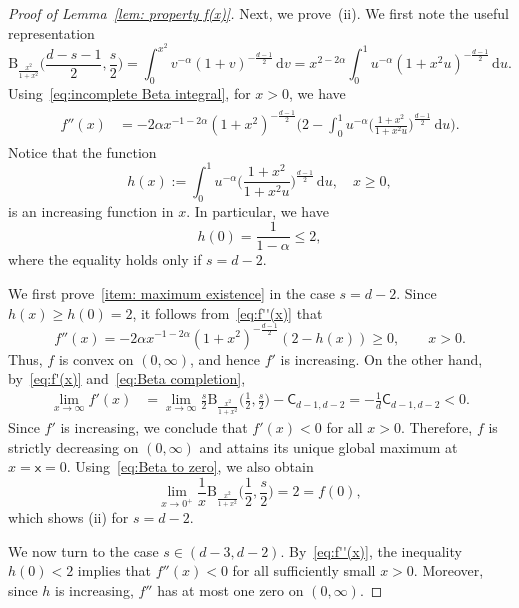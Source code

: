 \documentclass[10pt,a4paper]{amsart}
\newcommand{\ud}{\, \mathrm{d}}
\begin{document}
\begin{proof}[Proof of Lemma~\ref{lem: property f(x)}]
\medskip
Next, we prove~\textrm{(ii)}. We first note the useful representation 
\begin{equation}\label{eq:incomplete Beta integral}
    \mathrm{B}_{\frac{x^2}{1+x^2}}\Big(\frac{d-s-1}{2},\frac{s}{2}\Big) = \int_0^{x^2} v^{-\alpha}(1+v)^{-\frac{d-1}{2}}\ud v= x^{2-2\alpha}\int_0^1 u^{-\alpha}(1+x^2u)^{-\frac{d-1}{2}}\ud u.
\end{equation}
Using~\eqref{eq:incomplete Beta integral}, for $x>0$, we have 
\begin{align}\label{eq:f''(x)}
\begin{split}
    f''(x) 
    &= -2\alpha x^{-1-2\alpha}(1+x^2)^{-\frac{d-1}{2}}\bigg(2- \int_0^1  u^{-\alpha}\Big(\frac{1+x^2}{1+x^2u}\Big)^{\frac{d-1}{2}}\ud u\bigg).
\end{split}
\end{align}
Notice that the function
\[
h(x):= \int_0^1  u^{-\alpha}\Big(\frac{1+x^2}{1+x^2u}\Big)^{\frac{d-1}{2}}\ud u, \quad x\ge 0,
\]
is an increasing function in $x$. In particular, we have
\begin{equation}
    h(0) = \frac{1}{1-\alpha}\le 2,
\end{equation}
where the equality holds only if $s=d-2$. 

We first prove~\ref{item: maximum existence} in the case $s=d-2$. Since
$h(x)\ge h(0)=2$, it follows from~\eqref{eq:f''(x)} that 
\[
    f''(x) = -2\alpha x^{-1-2\alpha}(1+x^2)^{-\frac{d-1}{2}} (2-h(x) )\ge  0, \qquad x>0. 
\]
Thus, $f$ is convex on $(0,\infty)$, and hence $f'$ is increasing. On the
other hand, by~\eqref{eq:f'(x)} and~\eqref{eq:Beta completion}, 
\begin{align*}
    \lim_{x\to\infty} f'(x) &= \lim_{x\to\infty}\frac{s}{2}\mathrm{B}_{\frac{x^2}{1+x^2}}\Big(\frac{1}{2},\frac{s}{2}\Big) -\mathsf{C}_{d-1,d-2}=-\frac{1}{d}\mathsf{C}_{d-1,d-2}<0.
\end{align*}
Since $f'$ is increasing, we conclude that $f'(x)<0$ for all $x>0$.
Therefore, $f$ is strictly decreasing on $(0,\infty)$ and attains its
unique global maximum at $x=\mathsf{x}=0$. Using~\eqref{eq:Beta to zero}, we also obtain 
\[
    \lim_{x\to0^+}\frac{1}{x}\mathrm{B}_{\frac{x^2}{1+x^2}}\Big(\frac{1}{2},\frac{s}{2}\Big) = 2 = f(0),
\]
which shows (ii) for $s=d-2$. 
 

We now turn to the case $s\in(d-3,d-2)$. By~\eqref{eq:f''(x)},
the inequality $h(0)<2$ implies that $f''(x)<0$ for all sufficiently
small $x>0$. Moreover, since $h$ is increasing, $f''$ has at most one
zero on $(0,\infty)$.


\end{proof}
\end{document}

